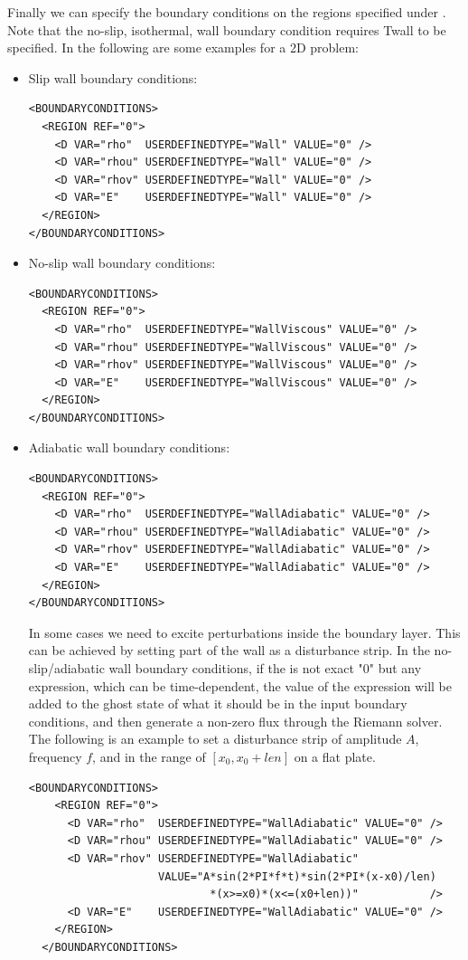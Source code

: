 Finally we can specify the boundary conditions on the regions specified under .
Note that the no-slip, isothermal, wall boundary condition requires Twall to be specified.
In the following are some examples for a 2D problem:
\begin{itemize}
\item Slip wall boundary conditions:
\begin{lstlisting}[style=XmlStyle]
<BOUNDARYCONDITIONS>
  <REGION REF="0">
    <D VAR="rho"  USERDEFINEDTYPE="Wall" VALUE="0" />
    <D VAR="rhou" USERDEFINEDTYPE="Wall" VALUE="0" />
    <D VAR="rhov" USERDEFINEDTYPE="Wall" VALUE="0" />
    <D VAR="E"    USERDEFINEDTYPE="Wall" VALUE="0" />
  </REGION>
</BOUNDARYCONDITIONS>
\end{lstlisting}

\item No-slip wall boundary conditions:
\begin{lstlisting}[style=XmlStyle]
<BOUNDARYCONDITIONS>
  <REGION REF="0">
    <D VAR="rho"  USERDEFINEDTYPE="WallViscous" VALUE="0" />
    <D VAR="rhou" USERDEFINEDTYPE="WallViscous" VALUE="0" />
    <D VAR="rhov" USERDEFINEDTYPE="WallViscous" VALUE="0" />
    <D VAR="E"    USERDEFINEDTYPE="WallViscous" VALUE="0" />
  </REGION>
</BOUNDARYCONDITIONS>
\end{lstlisting}

\item Adiabatic wall boundary conditions:
\begin{lstlisting}[style=XmlStyle]
<BOUNDARYCONDITIONS>
  <REGION REF="0">
    <D VAR="rho"  USERDEFINEDTYPE="WallAdiabatic" VALUE="0" />
    <D VAR="rhou" USERDEFINEDTYPE="WallAdiabatic" VALUE="0" />
    <D VAR="rhov" USERDEFINEDTYPE="WallAdiabatic" VALUE="0" />
    <D VAR="E"    USERDEFINEDTYPE="WallAdiabatic" VALUE="0" />
  </REGION>
</BOUNDARYCONDITIONS>
\end{lstlisting}

In some cases we need to excite perturbations inside the boundary layer.
This can be achieved by setting part of the wall as a disturbance strip.
In the no-slip/adiabatic wall boundary conditions, if the  is not
exact "0" but any expression, which can be time-dependent, the value of the
expression will be added to the ghost state of what it should be in the input
boundary conditions, and then generate a non-zero flux through the Riemann
solver. The following is an example to set a disturbance strip of amplitude
$A$, frequency $f$, and in the range of $[x_0, x_0+len]$ on a flat plate.
\begin{lstlisting}[style=XmlStyle]
  <BOUNDARYCONDITIONS>
    <REGION REF="0">
      <D VAR="rho"  USERDEFINEDTYPE="WallAdiabatic" VALUE="0" />
      <D VAR="rhou" USERDEFINEDTYPE="WallAdiabatic" VALUE="0" />
      <D VAR="rhov" USERDEFINEDTYPE="WallAdiabatic"
                    VALUE="A*sin(2*PI*f*t)*sin(2*PI*(x-x0)/len)
                            *(x>=x0)*(x<=(x0+len))"           />
      <D VAR="E"    USERDEFINEDTYPE="WallAdiabatic" VALUE="0" />
    </REGION>
  </BOUNDARYCONDITIONS>
\end{lstlisting}


\end{itemize}
